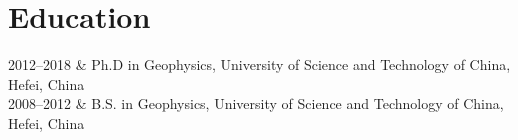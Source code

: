\section{Education}

\begin{EntriesTable}{0.18}{0.02}{0.80}
2012--2018 & Ph.D in Geophysics, University of Science and Technology of China, Hefei, China \\
2008--2012 & B.S. in Geophysics, University of Science and Technology of China, Hefei, China \\
\end{EntriesTable}
